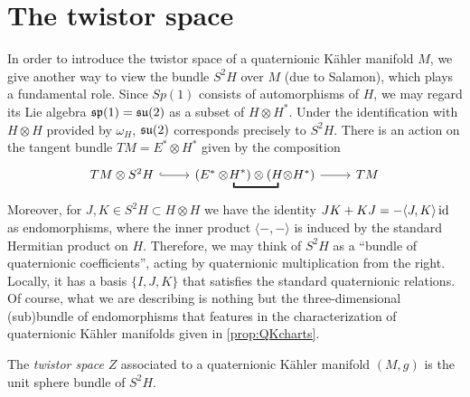 \section{The twistor space}

In order to introduce the twistor space of a quaternionic K\"ahler manifold $M$, we give another way to view the bundle $S^2H$ over $M$ (due to Salamon), which plays a fundamental role. Since $Sp(1)$ consists of automorphisms of $H$, we may regard its Lie algebra $\mathfrak{sp}(1)=\mathfrak{su}(2)$ as a subset of $H\otimes H^*$. Under the identification with $H\otimes H$ provided by $\omega_H$, $\mathfrak{su}(2)$ corresponds precisely to $S^2H$. There is an action on the tangent bundle $TM=E^*\otimes H^*$ given by the composition
\begin{equation*}
	\begin{tikzcd}
		TM\otimes S^2H\ar[r,hook] &
		(E^*\otimes\, \underbracket{\!\! H^*)\otimes (H\!\!}\,\otimes H^*)
		\ar[r] & TM
	\end{tikzcd}
\end{equation*}
Moreover, for $J,K\in S^2H\subset H\otimes H$ we have the identity $JK+KJ=-\langle J,K\rangle \operatorname{id}$ as endomorphisms, where the inner product $\langle -,-\rangle$ is induced by the standard Hermitian product on $H$. Therefore, we may think of $S^2H$ as a ``bundle of quaternionic coefficients'', acting by quaternionic multiplication from the right. Locally, it has a basis $\{I,J,K\}$ that satisfies the standard quaternionic relations. Of course, what we are describing is nothing but the three-dimensional (sub)bundle of endomorphisms that features in the characterization of quaternionic K\"ahler manifolds given in \cref{prop:QKcharts}.

\begin{mydef}
	The \emph{twistor space} $Z$ associated to a quaternionic K\"ahler manifold $(M,g)$ is the unit sphere bundle of $S^2H$.
\end{mydef}

